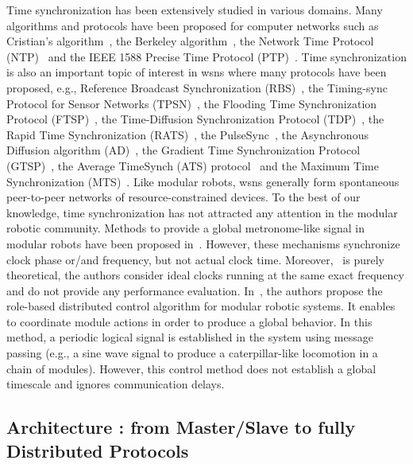 Time synchronization has been extensively studied in various domains. Many algorithms and protocols have been proposed for computer networks such as Cristian's algorithm~\cite{cristian1989proba}, the Berkeley algorithm~\cite{gusella1989accuracy}, the Network Time Protocol (NTP)~\cite{mills1991internet} and the IEEE 1588 Precise Time Protocol (PTP)~\cite{ptp2008}. Time synchronization is also an important topic of interest in \glspl{wsn} where many protocols have been proposed, e.g., Reference Broadcast Synchronization (RBS)~\cite{elson2002fine}, the Timing-sync Protocol for Sensor Networks (TPSN)~\cite{ganeriwal2003timing}, the Flooding Time Synchronization Protocol (FTSP)~\cite{maroti2004flooding}, the Time-Diffusion Synchronization Protocol (TDP)~\cite{su2005time}, the Rapid Time Synchronization (RATS)~\cite{kusy2007spatiotemporal}, the 
PulseSync~\cite{lenzen2009optimal,lenzen2015pulsesync}, the Asynchronous Diffusion algorithm (AD)~\cite{li2006global}, the Gradient Time Synchronization Protocol (GTSP)~\cite{sommer2009gradient}, the Average TimeSynch (ATS) protocol~\cite{schenato2011average} and the Maximum Time Synchronization (MTS)~\cite{he2014time}. Like modular robots, \glspl{wsn} generally form spontaneous peer-to-peer networks of resource-constrained devices. To the best of our knowledge, time synchronization has not attracted any attention in the modular robotic community. Methods to provide a global metronome-like signal in modular robots have been proposed in~\cite{kokaji1996clock, baca2010synchronizing}. However, these mechanisms synchronize clock phase or/and frequency, but not actual clock time. Moreover,~\cite{kokaji1996clock} is purely theoretical, the authors consider ideal clocks running at the same exact frequency and do not provide any performance evaluation. In~\cite{Stoy03,stoy2002make,stoy2002global}, the authors propose the role-based distributed control algorithm for modular robotic systems. It enables to coordinate module actions in order to produce a global behavior. In this method, a periodic logical signal is established in the system using message passing (e.g., a sine wave signal to produce a caterpillar-like locomotion in a chain of modules). However, this control method does not establish a global timescale and ignores communication delays.

\subsection{Architecture : from Master/Slave to fully Distributed Protocols}

